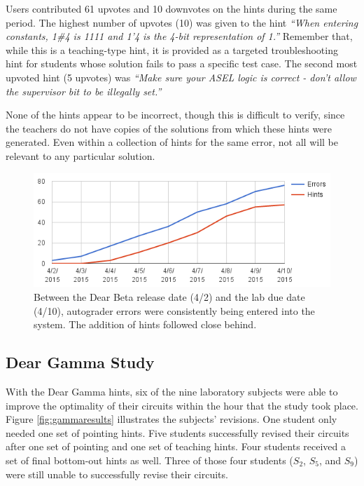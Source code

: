 Users contributed 61 upvotes and 10 downvotes on the hints during the same period. The highest number of upvotes (10) was given to the hint {\it ``When entering constants, 1\#4 is 1111 and 1'4 is the 4-bit representation of 1.''} Remember that, while this is a teaching-type hint, it is provided as a targeted troubleshooting hint for students whose solution fails to pass a specific test case. The second most upvoted hint (5 upvotes) was {\it ``Make sure your ASEL logic is correct - don't allow the supervisor bit to be illegally set.''} 

None of the hints appear to be incorrect, though this is difficult to verify, since the teachers do not have copies of the solutions from which these hints were generated. Even within a collection of hints for the same error, not all will be relevant to any particular solution.


\begin{figure}
\centering
\includegraphics[width=1.0\columnwidth]{Body/figures/classoverflow/cumulativeErrorsAndHints.png}
\caption{Between the Dear Beta release date (4/2) and the lab due date (4/10), autograder errors were consistently being entered into the system. The addition of hints followed close behind.}
\label{fig:betaengagement}
\end{figure}


\subsection{Dear Gamma Study}

With the Dear Gamma hints, six of the nine laboratory subjects were able to improve the optimality of their circuits within the hour that the study took place. Figure \ref{fig:gammaresults} illustrates the subjects' revisions. One student only needed one set of pointing hints. Five students successfully revised their circuits after one set of pointing and one set of teaching hints. Four students received a set of final bottom-out hints as well. Three of those four students ($S_2$, $S_5$, and $S_9$) were still unable to successfully revise their circuits. 

